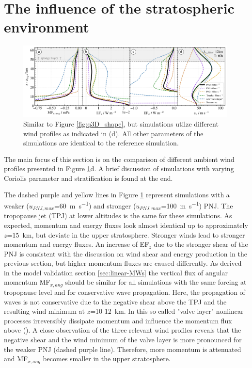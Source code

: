 \section{The influence of the stratospheric environment}
\label{sec:q3D-wind}
\begin{figure}[t]
    \centering
    \includegraphics[width=0.99\textwidth]{figures_q3D/TD-zprofiles-translbq3D_wind-T60h-avg.png}
    \caption{Similar to Figure \ref{fig:q3D_shape}, but simulations utilze different wind profiles as indicated in (d). All other parameters of the simulations are identical to the reference simulation.}
    \label{fig:q3D_wind}
\end{figure}
The main focus of this section is on the comparison of different ambient wind profiles presented in Figure \ref{fig:q3D_wind}d. A brief discussion of simulations with varying Coriolis parameter and stratification is found at the end.

The dashed purple and yellow lines in Figure \ref{fig:q3D_wind} represent simulations with a weaker ($u_{PNJ,max}$=\SI{60}{\meter\per\second}) and stronger ($u_{PNJ,max}$=\SI{100}{\meter\per\second}) PNJ. The tropopause jet (TPJ) at lower altitudes is the same for these simulations. As expected, momentum and energy fluxes look almost identical up to approximately $z$=\SI{15}{\kilo\meter}, but deviate in the upper stratosphere. Stronger winds lead to stronger momentum and energy fluxes. An increase of EF$_z$ due to the stronger shear of the PNJ is consistent with the discussion on wind shear and energy production in the previous section, but higher momentum fluxes are caused differently. As derived in the model validation section \ref{sec:linear-MWs} the vertical flux of angular momentum MF$_{x,ang}$ should be similar for all simulations with the same forcing at tropopause level and for conservative wave propagation. Here, the propagation of waves is not conservative due to the negative shear above the TPJ and the resulting wind minimum at $z$=10-\SI{12}{\kilo\meter}. In this so-called "valve layer" nonlinear processes irreversibly dissipate momentum and influence the momentum flux above (\cite[]{kruse_midlatitude_2016}). A close observation of the three relevant wind profiles reveals that the negative shear and the wind minimum of the valve layer is more pronounced for the weaker PNJ (dashed purple line). Therefore, more momentum is attenuated and MF$_{x,ang}$ becomes smaller in the upper stratosphere.

